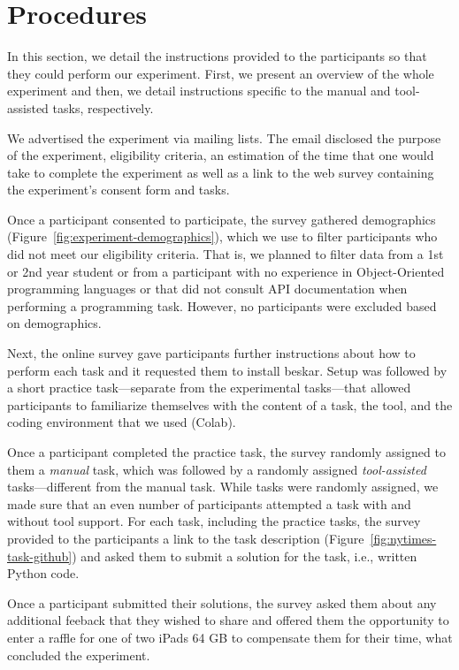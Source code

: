 
\section{Procedures}
\label{cp6:procedures}



In this section, we detail the instructions provided to the participants so that 
they could perform our experiment. 
First, we present an overview of the whole experiment and then, we detail
instructions specific to the manual and tool-assisted tasks, respectively.


We advertised the experiment via mailing lists. The email disclosed the purpose of the experiment, eligibility criteria, an estimation of the time that one would take to complete the experiment as well as a link 
to the web survey containing the experiment's consent form and tasks. 


Once a participant consented to participate, the survey gathered demographics (Figure~\ref{fig:experiment-demographics}), which we use to filter participants who did not meet our eligibility criteria. That is, we planned to filter data from a 1st or 2nd year student or from a participant with no experience in Object-Oriented programming languages or that did not consult API documentation when performing a programming task. However, no participants were excluded based on demographics.





Next, the online survey gave participants further instructions 
about how to perform each task and it requested them to install \acs{beskar}.
Setup was followed by a short practice task---separate from the experimental tasks---that allowed participants to familiarize themselves with the content of a task, the tool, and the coding environment that we used (Colab). 


Once a participant completed the practice task, the survey randomly assigned to them a \textit{manual} task, which was followed by a randomly assigned \textit{tool-assisted} tasks---different from the manual task. While tasks were randomly assigned, we made sure that an even number of participants attempted a task with and without tool support.
For each task, including the practice tasks, the survey provided to the participants a link 
to the task description (Figure~\ref{fig:nytimes-task-github}) and asked them to submit a solution for the task, i.e., written Python code. 


Once a participant submitted their solutions, the survey
asked them about any additional feeback that they wished to share and 
offered them the opportunity to enter a raffle for one of two iPads 64 GB 
to compensate them for their time, what concluded the experiment.



